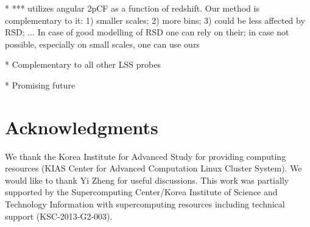 \documentclass[iop]{emulateapj}
\begin{document}
 * *** utilizes angular 2pCF as a function of redshift. Our method is complementary to it: 1) smaller scales; 2) more bins; 3) could be less affected by RSD; ... In case of good modelling of RSD one can rely on their; in case not possible, especially on small scales, one can use ours

 * Complementary to all other LSS probes

 * Promising future



\section*{Acknowledgments}

We thank the Korea Institute for Advanced Study for providing computing resources (KIAS Center for Advanced Computation Linux Cluster System).
We would like to thank Yi Zheng for useful discussions.
This work was partially supported by the
Supercomputing Center/Korea Institute of Science and
Technology Information with supercomputing resources
including technical support (KSC-2013-G2-003).


\appendix

\
\end{document}
